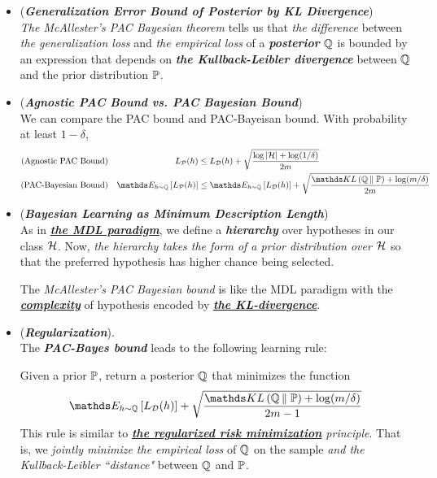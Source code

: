 \documentclass[11pt]{article}
\begin{document}
\begin{itemize}
\item \begin{remark}(\textbf{\emph{Generalization Error Bound of Posterior by KL Divergence}})\\
\emph{The McAllester's PAC Bayesian theorem} tells us that \emph{the difference} between \emph{the generalization loss} and \emph{the empirical loss} of a \emph{\textbf{posterior}} ${\mathbb Q}$ is bounded by an expression that depends on \emph{\textbf{the Kullback-Leibler divergence}} between ${\mathbb Q}$ and the prior distribution ${\mathbb P}$.
\end{remark}

\item \begin{remark}(\textbf{\emph{Agnostic PAC Bound vs. PAC Bayesian Bound}})\\
We can compare the PAC bound and PAC-Bayeisan bound. With probability at least $1-\delta$,
\begin{align*}
(\text{Agnostic PAC Bound}) && L_{\cP}(h) &\le L_{\cD}(h) + \sqrt{\frac{\log\abs{\cH} + \log(1/\delta)}{2m}} \\
(\text{PAC-Bayesian Bound}) &&\E{h \sim \bQ}{L_{\cP}(h)} &\le \E{h \sim \bQ}{L_{\cD}(h)} + \sqrt{\frac{ \kl{\bQ}{\bP}  + \log(m/\delta)}{2m}}
\end{align*}
\end{remark}


\item \begin{remark}(\textbf{\emph{Bayesian Learning as Minimum Description Length}})\\
As in \underline{\emph{\textbf{the MDL paradigm}}}, we define a \emph{\textbf{hierarchy}} over hypotheses in our class ${\mathcal H}$. Now, \emph{the hierarchy takes the form of a prior distribution over ${\mathcal H}$} so that the preferred hypothesis has higher chance being selected.  

The \emph{McAllester's PAC Bayesian bound} is like the MDL paradigm with the \underline{\emph{\textbf{complexity}}} of hypothesis encoded by \underline{\emph{\textbf{the KL-divergence}}}. 
\end{remark}

\item \begin{remark} (\textbf{\emph{Regularization}}). \\
The \emph{\textbf{PAC-Bayes bound}} leads to the following learning rule:

Given a prior ${\mathbb P}$, return a posterior ${\mathbb Q}$ that minimizes the function
\begin{align}
 \E{h \sim \bQ}{L_{\cD}(h)} + \sqrt{\frac{ \kl{\bQ}{\bP}  + \log(m/\delta)}{2m-1}} \label{eqn: pac_bayes_learning}
\end{align}
This rule is similar to \emph{\textbf{\underline{the regularized risk minimization}} principle}. That is, we \emph{jointly minimize the empirical loss} of ${\mathbb Q}$ on the sample \emph{and the Kullback-Leibler ``distance"} between ${\mathbb Q}$ and ${\mathbb P}$.
\end{remark}



\end{itemize}
\end{document}
